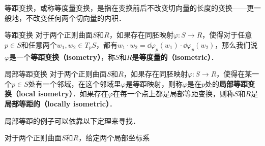 

等距变换，或称等度量变换，是指在变换前后不改变切向量的长度的变换——更一般地，不改变任何两个切向量的内积．

\begin{definition}{等距变换}
对于两个正则曲面$S$和$R$，如果存在同胚映射$\varphi:S\to R$，使得对于任意$p\in S$和任意两个$w_1, w_2\in T_pS$，都有$w_1\cdot w_2=\dd\varphi_p(w_1)\cdot\dd\varphi_p(w_2)$，那么我们说$\varphi$是一个\textbf{等距变换（isometry）}，称$S$和$R$是\textbf{等度量的（isometric）}．
\end{definition}

\begin{definition}{局部等距变换}
对于两个正则曲面$S$和$R$，如果存在同胚映射$\varphi:S\to R$，使得在某一个$p\in S$处有一个邻域，在这个邻域里$\varphi$是等距映射，则称$\varphi$是在$p$处的\textbf{局部等距变换（local isometry）}．如果存在$\varphi$在每一个点上都是局部等距变换，则称$S$和$R$是\textbf{局部等距的（locally isometric）}．
\end{definition}

局部等距的例子可以依靠以下定理来寻找．

\begin{theorem}{}
对于两个正则曲面$S$和$R$，给定两个局部坐标系$$
\end{theorem}




